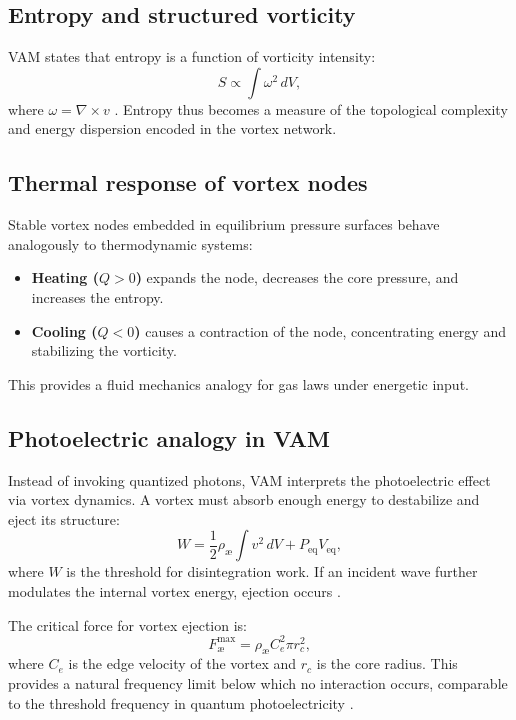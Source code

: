 \documentclass[preprint]{revtex4-2}
\begin{document}
\subsection{Entropy and structured vorticity}

VAM states that entropy is a function of vorticity intensity:
\begin{equation}
    S \propto \int \omega^2 \, dV,\label{eq:entropy_vorticity}
\end{equation}
where $\omega = \nabla \times v$ \cite{kelvin1867vortex}. Entropy thus becomes a measure of the topological complexity and energy dispersion encoded in the vortex network.

\subsection{Thermal response of vortex nodes}

Stable vortex nodes embedded in equilibrium pressure surfaces behave analogously to thermodynamic systems:
\begin{itemize}
    \item \textbf{Heating ($Q > 0$)} expands the node, decreases the core pressure, and increases the entropy. \item \textbf{Cooling ($Q < 0$)} causes a contraction of the node, concentrating energy and stabilizing the vorticity.
\end{itemize}
This provides a fluid mechanics analogy for gas laws under energetic input.

\subsection{Photoelectric analogy in VAM}

Instead of invoking quantized photons, VAM interprets the photoelectric effect via vortex dynamics. A vortex must absorb enough energy to destabilize and eject its structure:
\begin{equation}
    W = \frac{1}{2} \rho_\text{\ae} \int v^2 \, dV + P_\text{eq} V_\text{eq},\label{eq:photoelectric_work}
\end{equation}
where $W$ is the threshold for disintegration work. If an incident wave further modulates the internal vortex energy, ejection occurs \cite{iskandarani2025swirl}.

The critical force for vortex ejection is:
\begin{equation}
    F^{\text{max}}_{\text{\ae}} = \rho_\text{\ae} C_e^2 \pi r_c^2,\label{eq:critical_force}
\end{equation}
where $C_e$ is the edge velocity of the vortex and $r_c$ is the core radius. This provides a natural frequency limit below which no interaction occurs, comparable to the threshold frequency in quantum photoelectricity \cite{einstein1905photoelectric}.
\end{document}
